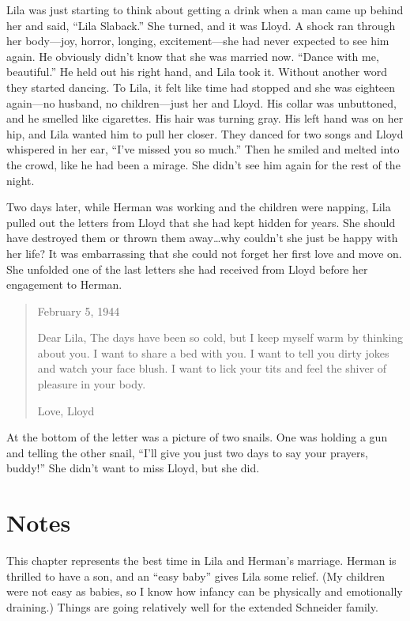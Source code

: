 \documentclass[
  american,
  letterpaper,
]{book}
\begin{document}
Lila was just starting to think about getting a drink when a man came up
behind her and said, ``Lila Slaback.'' She turned, and it was Lloyd. A
shock ran through her body---joy, horror, longing, excitement---she had
never expected to see him again. He obviously didn't know that she was
married now. ``Dance with me, beautiful.'' He held out his right hand,
and Lila took it. Without another word they started dancing. To Lila, it
felt like time had stopped and she was eighteen again---no husband, no
children---just her and Lloyd. His collar was unbuttoned, and he smelled
like cigarettes. His hair was turning gray. His left hand was on her
hip, and Lila wanted him to pull her closer. They danced for two songs
and Lloyd whispered in her ear, ``I've missed you so much.'' Then he
smiled and melted into the crowd, like he had been a mirage. She didn't
see him again for the rest of the night.

Two days later, while Herman was working and the children were napping,
Lila pulled out the letters from Lloyd that she had kept hidden for
years. She should have destroyed them or thrown them away\ldots why
couldn't she just be happy with her life? It was embarrassing that she
could not forget her first love and move on. She unfolded one of the
last letters she had received from Lloyd before her engagement to
Herman.

\begin{quote}
February 5, 1944

Dear Lila, The days have been so cold, but I keep myself warm by
thinking about you. I want to share a bed with you. I want to tell you
dirty jokes and watch your face blush. I want to lick your tits and feel
the shiver of pleasure in your body.

Love, Lloyd
\end{quote}

At the bottom of the letter was a picture of two snails. One was holding
a gun and telling the other snail, ``I'll give you just two days to say
your prayers, buddy!'' She didn't want to miss Lloyd, but she did.

\section{Notes}\label{notes-40}

This chapter represents the best time in Lila and Herman's marriage.
Herman is thrilled to have a son, and an ``easy baby'' gives Lila some
relief. (My children were not easy as babies, so I know how infancy can
be physically and emotionally draining.) Things are going relatively
well for the extended Schneider family.
\end{document}
